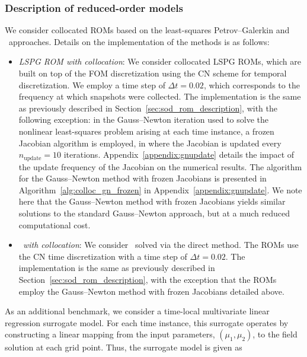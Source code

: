 \subsubsection{Description of reduced-order models}\label{sec:swe_describe_roms}
We consider collocated ROMs based on the least-squares Petrov--Galerkin and \methodAcronym\ approaches. Details on the implementation of the methods is as follows:
\begin{itemize}

\item \textit{LSPG ROM with collocation}: We consider collocated LSPG ROMs, which are built on top of the FOM discretization using the CN scheme for temporal 
discretization. We employ a time step of $\Delta t  = 0.02$, which corresponds to the frequency at which snapshots were collected. 
The implementation is the same as previously described in Section~\ref{sec:sod_rom_description}, with the following exception: in the Gauss--Newton iteration used to solve the nonlinear least-squares problem arising at each time instance, a frozen Jacobian algorithm is employed, in where the Jacobian is updated every $n_{\text{update}}=10$ iterations. Appendix~\ref{appendix:gnupdate} details the impact of the update frequency of the Jacobian on the numerical results. The algorithm for the Gauss--Newton method with frozen Jacobians is presented in Algorithm~\ref{alg:colloc_gn_frozen} in Appendix~\ref{appendix:gnupdate}. We note here that the Gauss--Newton method with frozen Jacobians yields similar solutions to the standard Gauss--Newton approach, but at a much reduced computational cost.  
 
\item \textit{\methodAcronymROMs\ with collocation}: We consider \methodAcronymROMs\ solved via the direct method. The ROMs use the CN time discretization with a time step of 
$\Delta t = 0.02$. The implementation is the same as previously described in Section~\ref{sec:sod_rom_description}, with the exception that the ROMs employ the Gauss--Newton method with frozen Jacobians detailed above. 
\end{itemize}
As an additional benchmark, we consider a time-local multivariate linear regression surrogate model. For each time instance, this surrogate operates by constructing a linear mapping from the input parameters, $(\mu_1 ,\mu_2)$, to the field solution at each grid point. Thus, the surrogate model is given as
